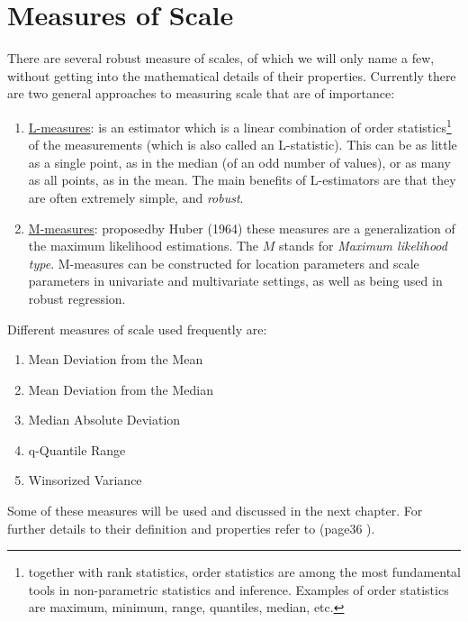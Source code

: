 \documentclass[
]{article}
\providecommand{\tightlist}{%
  \setlength{\itemsep}{0pt}\setlength{\parskip}{0pt}}
\begin{document}
\section*{Measures of Scale}\label{measures-of-scale}

There are several robust measure of scales, of which we will only name a few, without getting into the mathematical details of their properties. Currently there are two general approaches to measuring scale that are of importance:

\begin{enumerate}
\def\labelenumi{\arabic{enumi}.}
\tightlist
\item
  \href{https://en.wikipedia.org/wiki/L-estimator}{L-measures}: is an estimator which is a linear combination of order statistics\footnote{together with rank statistics, order statistics are among the most fundamental tools in non-parametric statistics and inference. Examples of order statistics are maximum, minimum, range, quantiles, median, etc.} of the measurements (which is also called an L-statistic). This can be as little as a single point, as in the median (of an odd number of values), or as many as all points, as in the mean. The main benefits of L-estimators are that they are often extremely simple, and \emph{robust}.
\item
  \href{https://en.wikipedia.org/wiki/M-estimator}{M-measures}: proposedby Huber (1964) these measures are a generalization of the maximum likelihood estimations. The \(M\) stands for \emph{Maximum likelihood type}. M-measures can be constructed for location parameters and scale parameters in univariate and multivariate settings, as well as being used in robust regression.
\end{enumerate}

Different measures of scale used frequently are:

\begin{enumerate}
\def\labelenumi{\arabic{enumi}.}
\tightlist
\item
  Mean Deviation from the Mean
\item
  Mean Deviation from the Median
\item
  Median Absolute Deviation
\item
  q-Quantile Range
\item
  Winsorized Variance
\end{enumerate}

Some of these measures will be used and discussed in the next chapter. For further details to their definition and properties refer to (page36 ).
\end{document}
